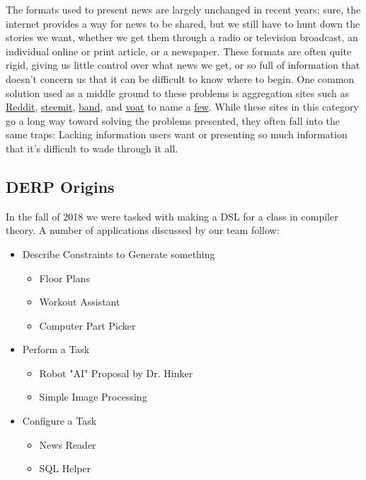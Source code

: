 \documentclass{article}
\begin{document}
The formats used to present news are largely unchanged in recent years; sure, the internet provides a way for news to be shared, but we still have to hunt down the stories we want, whether we get them through a radio or television broadcast, an individual online or print article, or a newspaper. These formats are often quite rigid, giving us little control over what news we get, or so full of information that doesn't concern us that it can be difficult to know where to begin. One common solution used as a middle ground to these problems is aggregation sites such as \href{https://www.reddit.com}{Reddit}, \href{https://steemit.com/}{steemit}, \href{https://band.us/home}{band}, and \href{https://voat.co/}{voat} to name a \href{https://www.reddit.com/r/RedditAlternatives/comments/8585ox/list_of_active_reddit_alternatives/}{few}. While these sites in this category go a long way toward solving the problems presented, they often fall into the same traps: Lacking information users want or presenting so much information that it's difficult to wade through it all.

\subsection{DERP Origins}
In the fall of 2018 we were tasked with making a DSL for a class in compiler theory. A number of applications discussed by our team follow:
\begin{itemize}
    \item{Describe Constraints  to Generate something}
    \begin{itemize}
        \item{Floor Plans}
        \item{Workout Assistant}
        \item{Computer Part Picker}
    \end{itemize}
    \item{Perform a Task}
    \begin{itemize}
        \item{Robot "AI" Proposal by Dr. Hinker}
        \item{Simple Image Processing}
    \end{itemize}
    \item{Configure a Task}
    \begin{itemize}
        \item{News Reader}
        \item{SQL Helper}        
    \end{itemize}
\end{itemize}
\end{document}
